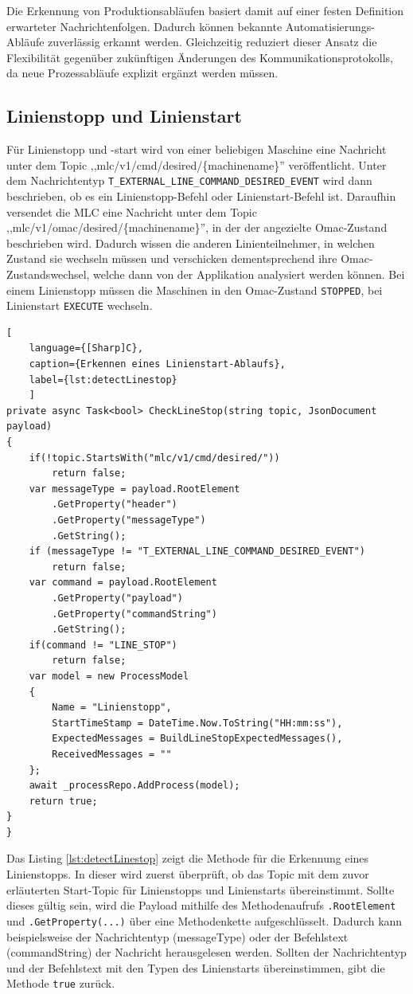 Die Erkennung von Produktionsabläufen basiert damit auf einer festen Definition erwarteter Nachrichtenfolgen. Dadurch können bekannte Automatisierungs-Abläufe zuverlässig erkannt werden. Gleichzeitig reduziert dieser Ansatz die Flexibilität gegenüber zukünftigen Änderungen des Kommunikationsprotokolls, da neue Prozessabläufe explizit ergänzt werden müssen.
\subsection{Linienstopp und Linienstart}
Für Linienstopp und -start wird von einer beliebigen Maschine eine Nachricht unter dem Topic ,,mlc/v1/cmd/desired/\{machinename\}'' veröffentlicht. Unter dem Nachrichtentyp \texttt{T\allowbreak\_EXTERNAL\allowbreak\_LINE\allowbreak\_COMMAND\allowbreak\_DESIRED\_\-EVENT} wird dann beschrieben, ob es ein Linienstopp-Befehl oder Linien\-start-Befehl ist. Daraufhin versendet die MLC eine Nachricht unter dem Topic ,,mlc\allowbreak/v1\allowbreak/omac/de\-sired\allowbreak/\{machinename\}'', in der der angezielte Omac-Zustand beschrieben wird. Dadurch wissen die anderen Linienteilnehmer, in welchen Zustand sie wechseln müssen und verschicken dementsprechend ihre Omac-Zustandswechsel, welche dann von der Applikation analysiert werden können. Bei einem Linienstopp müssen die Maschinen in den Omac-Zustand \texttt{STOP\-PED}, bei Linienstart \texttt{EXE\-CUTE} wechseln.
\begin{lstlisting}[
    language={[Sharp]C},
    caption={Erkennen eines Linienstart-Ablaufs},
    label={lst:detectLinestop}
    ]
private async Task<bool> CheckLineStop(string topic, JsonDocument payload)
{
    if(!topic.StartsWith("mlc/v1/cmd/desired/"))
        return false;
    var messageType = payload.RootElement
        .GetProperty("header")
        .GetProperty("messageType")
        .GetString();
    if (messageType != "T_EXTERNAL_LINE_COMMAND_DESIRED_EVENT")
        return false;
    var command = payload.RootElement
        .GetProperty("payload")
        .GetProperty("commandString")
        .GetString();
    if(command != "LINE_STOP")
        return false;
    var model = new ProcessModel
    {
        Name = "Linienstopp",
        StartTimeStamp = DateTime.Now.ToString("HH:mm:ss"),
        ExpectedMessages = BuildLineStopExpectedMessages(),
        ReceivedMessages = ""
    };
    await _processRepo.AddProcess(model);
    return true;
}
}
\end{lstlisting}

Das Listing \ref{lst:detectLinestop} zeigt die Methode für die Erkennung eines Linienstopps. In dieser wird zuerst überprüft, ob das Topic mit dem zuvor erläuterten Start-Topic für Linienstopps und Linienstarts übereinstimmt. Sollte dieses gültig sein, wird die Payload mithilfe des Methodenaufrufs \texttt{.RootElement} und \texttt{.GetProperty(...)} über eine Methodenkette aufgeschlüsselt. Dadurch kann beispielsweise der Nachrichtentyp (messageType) oder der Befehlstext (commandString) der Nachricht herausgelesen werden. Sollten der Nachrichtentyp und der Befehlstext mit den Typen des Linienstarts übereinstimmen, gibt die Methode \texttt{true} zurück. 

